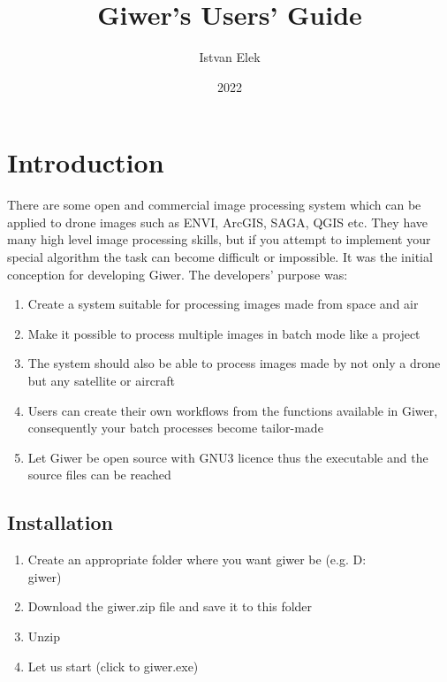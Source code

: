 \documentclass[a4paper,12pt]{article}
\begin{document}
\author{Istvan Elek}

\title{Giwer's Users' Guide}


\date{2022}


\setcounter{tocdepth}{3}
\maketitle
\newpage
\tableofcontents
\newpage


\section{Introduction}

There are some open and commercial image processing system which can be applied to drone images such as ENVI, ArcGIS, SAGA, QGIS etc. They have many high level image processing skills, but if you attempt to implement your special algorithm the task can become difficult or impossible. It was the initial conception for developing Giwer.
The developers' purpose was:

\begin{enumerate}
	\item Create a system suitable for processing images made from space and air
	\item Make it possible to process multiple images in batch mode like a project
	\item The system should also be able to process images made by not only a drone but any satellite or aircraft
	\item Users can create their own workflows from the functions available in Giwer, consequently your batch processes become tailor-made
	\item Let Giwer be open source with GNU3 licence thus the executable and the source files can be reached
\end{enumerate}

\subsection{Installation}

\begin{enumerate}
	\item Create an appropriate folder where you want giwer be (e.g. D:\\giwer)
	\item Download the giwer.zip file and save it to this folder
	\item Unzip
	\item Let us start (click to giwer.exe)
\end{enumerate}
\end{document}
